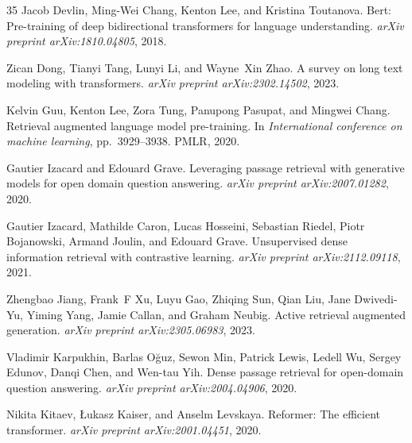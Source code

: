 \documentclass[UTF8,fontset=fandol,a4paper,11pt]{ctexart}
\begin{document}
\begin{thebibliography}{35}
Jacob Devlin, Ming-Wei Chang, Kenton Lee, and Kristina Toutanova.
\newblock Bert: Pre-training of deep bidirectional transformers for language understanding.
\newblock \emph{arXiv preprint arXiv:1810.04805}, 2018.

Zican Dong, Tianyi Tang, Lunyi Li, and Wayne~Xin Zhao.
\newblock A survey on long text modeling with transformers.
\newblock \emph{arXiv preprint arXiv:2302.14502}, 2023.

Kelvin Guu, Kenton Lee, Zora Tung, Panupong Pasupat, and Mingwei Chang.
\newblock Retrieval augmented language model pre-training.
\newblock In \emph{International conference on machine learning}, pp.\  3929--3938. PMLR, 2020.

Gautier Izacard and Edouard Grave.
\newblock Leveraging passage retrieval with generative models for open domain question answering.
\newblock \emph{arXiv preprint arXiv:2007.01282}, 2020.

Gautier Izacard, Mathilde Caron, Lucas Hosseini, Sebastian Riedel, Piotr Bojanowski, Armand Joulin, and Edouard Grave.
\newblock Unsupervised dense information retrieval with contrastive learning.
\newblock \emph{arXiv preprint arXiv:2112.09118}, 2021.

Zhengbao Jiang, Frank~F Xu, Luyu Gao, Zhiqing Sun, Qian Liu, Jane Dwivedi-Yu, Yiming Yang, Jamie Callan, and Graham Neubig.
\newblock Active retrieval augmented generation.
\newblock \emph{arXiv preprint arXiv:2305.06983}, 2023.

Vladimir Karpukhin, Barlas O{\u{g}}uz, Sewon Min, Patrick Lewis, Ledell Wu, Sergey Edunov, Danqi Chen, and Wen-tau Yih.
\newblock Dense passage retrieval for open-domain question answering.
\newblock \emph{arXiv preprint arXiv:2004.04906}, 2020.

Nikita Kitaev, {\L}ukasz Kaiser, and Anselm Levskaya.
\newblock Reformer: The efficient transformer.
\newblock \emph{arXiv preprint arXiv:2001.04451}, 2020.


\end{thebibliography}
\end{document}
